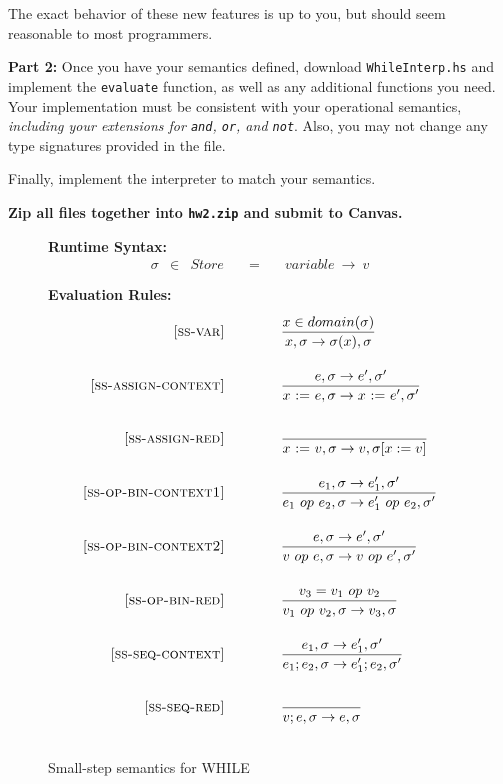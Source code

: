 \documentclass{article}
\begin{document}
The exact behavior of these new features is up to you,
but should seem reasonable to most programmers.

\bigskip
\noindent
{\bf Part 2:}
Once you have your semantics defined,
download {\tt WhileInterp.hs} and implement the {\tt evaluate} function,
as well as any additional functions you need.
Your implementation must be consistent with your operational semantics,
{\it including your extensions for {\tt and}, {\tt or}, and {\tt not}}.
Also, you may not change any type signatures provided in the file.

Finally, implement the interpreter to match your semantics.

\bigskip
\noindent
{\bf Zip all files together into {\tt hw2.zip} and submit to Canvas.}




\begin{figure}[H]\label{fig:smallstep}
\caption{Small-step semantics for WHILE}
{\bf Runtime Syntax:}
\[
\begin{array}{rclcl}
   \sigma & \in & {Store} \quad  & = & \quad {variable} ~\rightarrow ~v \\
  \\
\end{array}
\]
{\bf Evaluation Rules:~~~ } \\
\[
\begin{array}{r@{\qquad\qquad}l}
\ssrule{ss-var}{
  x \in domain(\sigma)
}{
  {x},{\sigma}\rightarrow{\sigma(x)},{\sigma}
}
\ssrule{ss-assign-context}{
  {e},{\sigma}\rightarrow{e'},{\sigma'}
}{
  {\assign{x}{e}},{\sigma}\rightarrow{\assign{x}{e'}},{\sigma'}
}
\ssrule{ss-assign-red}{
}{
  {\assign{x}{v}},{\sigma}\rightarrow{v},{\sigma[x:=v]}
}
\ssrule{ss-op-bin-context1}{
  {e_1},{\sigma}\rightarrow{e_1'},{\sigma'}
}{
  {e_1~op~e_2},{\sigma}\rightarrow{e_1'~op~e_2},{\sigma'}
}
\ssrule{ss-op-bin-context2}{
  {e},{\sigma}\rightarrow{e'},{\sigma'}
}{
  {v~op~e},{\sigma}\rightarrow{v~op~e'},{\sigma'}
}
\ssrule{ss-op-bin-red}{
  v_3 = v_1 ~op~ v_2
}{
  {v_1~op~v_2},{\sigma}\rightarrow{v_3},{\sigma}
}
\ssrule{ss-seq-context}{
  {e_1},{\sigma}\rightarrow{e_1'},{\sigma'} 
}{
  {e_1;e_2},{\sigma}\rightarrow{e_1';e_2},{\sigma'}
}
\ssrule{ss-seq-red}{
}{
  {v;e},{\sigma}\rightarrow{e},{\sigma}
}
\end{array}
\]
\end{figure}
\end{document}
